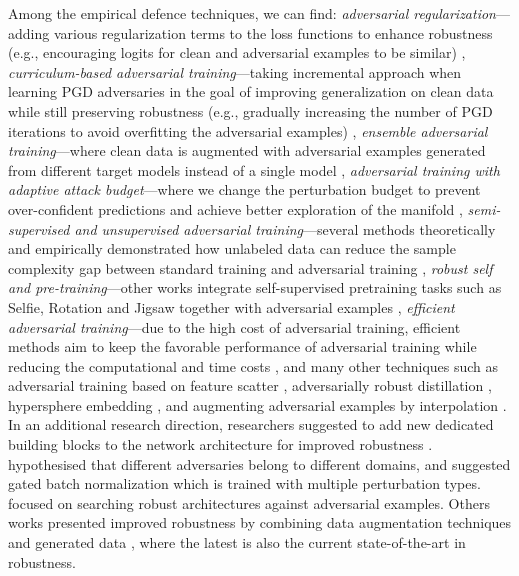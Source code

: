 Among the empirical defence techniques, we can find: \textit{adversarial regularization}---adding various regularization terms to the loss functions to enhance robustness (e.g., encouraging logits for clean and adversarial examples to be similar) \citep{kurakin2016atscale, madry2017towards, zhang2019theoretically, wang2019improving, kannan2018adversarial, jin2022enhancing}, \textit{curriculum-based adversarial training}---taking incremental approach when learning PGD adversaries in the goal of improving generalization on clean data while still preserving robustness (e.g., gradually increasing the number of PGD iterations to avoid overfitting the adversarial examples) \citep{cai2018curriculum, zhang2020attacks, wang2019convergence}, \textit{ensemble adversarial training}---where clean data is augmented with adversarial
examples generated from different target models instead of
a single model \citep{tramer2017ensemble, pang2019improving, yang2020dverge}, \textit{adversarial training with adaptive attack budget}---where we change the perturbation budget to prevent over-confident predictions and achieve better exploration of the manifold \citep{ding2018mma, cheng2020cat}, \textit{semi-supervised and unsupervised adversarial training}---several methods theoretically and empirically demonstrated how unlabeled data can reduce the sample complexity gap between
standard training and adversarial training  \citep{carmon2019unlabeled, uesato2019labels, zhai2019adversarially}, \textit{robust self and pre-training}---other works integrate self-supervised pretraining tasks such as Selfie, Rotation and Jigsaw together with adversarial examples \citep{jiang2020robust, chen2020adversarial}, \textit{efficient adversarial training}---due to the high cost of adversarial training, efficient methods aim to keep the favorable performance of adversarial training while reducing the computational and time costs \citep{shafahi2019adversarial, wong2020fast, andriushchenko2020understanding, zhang2019you}, and many other techniques such as adversarial training based on feature scatter \citep{zhang2019defense}, adversarially robust distillation \citep{goldblum2020adversarially}, hypersphere embedding \citep{pang2020boosting}, and augmenting adversarial examples by interpolation \citep{lee2020adversarial}. In an additional research direction, researchers suggested to add new dedicated building blocks to the network architecture for improved robustness \citep{xie2019intriguing, xie2019feature, liu2020towards}. \citet{liu2020towards} hypothesised that different adversaries belong to different domains, and suggested gated batch normalization which is trained with multiple perturbation types. \cite{guo2020meets} focused on searching robust architectures against adversarial examples. Others works presented improved robustness by combining data augmentation techniques and generated data \citep{rebuffi2021fixing, rebuffi2021data}, where the latest is also the current state-of-the-art in robustness. 

